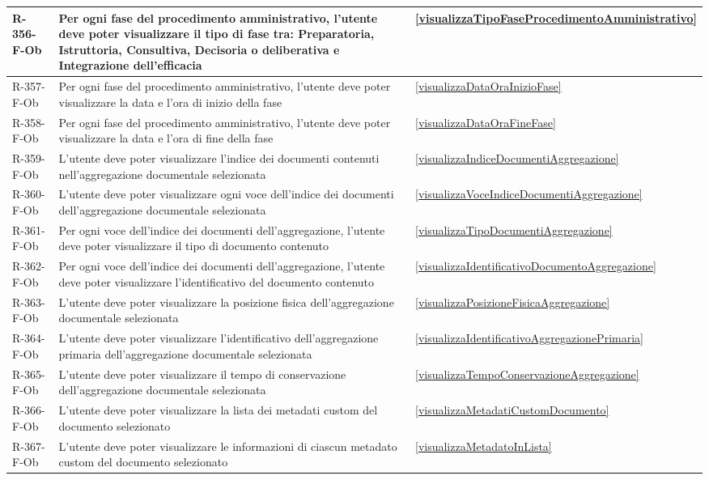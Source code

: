\begin{longtable}{|p{2.5cm}|p{9.5cm}|p{2.5cm}|}
\hline
R-356-F-Ob & Per ogni fase del procedimento amministrativo, l'utente deve poter visualizzare il tipo di fase tra: Preparatoria, Istruttoria, Consultiva, Decisoria o deliberativa e Integrazione dell'efficacia & \ref{visualizzaTipoFaseProcedimentoAmministrativo} \\
\hline
R-357-F-Ob & Per ogni fase del procedimento amministrativo, l'utente deve poter visualizzare la data e l'ora di inizio della fase & \ref{visualizzaDataOraInizioFase} \\
\hline
R-358-F-Ob & Per ogni fase del procedimento amministrativo, l'utente deve poter visualizzare la data e l'ora di fine della fase & \ref{visualizzaDataOraFineFase} \\
\hline
R-359-F-Ob & L'utente deve poter visualizzare l'indice dei documenti contenuti nell'aggregazione documentale selezionata & \ref{visualizzaIndiceDocumentiAggregazione} \\
\hline
R-360-F-Ob & L'utente deve poter visualizzare ogni voce dell'indice dei documenti dell'aggregazione documentale selezionata & \ref{visualizzaVoceIndiceDocumentiAggregazione} \\
\hline
R-361-F-Ob & Per ogni voce dell'indice dei documenti dell'aggregazione, l'utente deve poter visualizzare il tipo di documento contenuto & \ref{visualizzaTipoDocumentiAggregazione} \\
\hline
R-362-F-Ob & Per ogni voce dell'indice dei documenti dell'aggregazione, l'utente deve poter visualizzare l'identificativo del documento contenuto & \ref{visualizzaIdentificativoDocumentoAggregazione} \\
\hline
R-363-F-Ob & L'utente deve poter visualizzare la posizione fisica dell'aggregazione documentale selezionata & \ref{visualizzaPosizioneFisicaAggregazione} \\
\hline
R-364-F-Ob & L'utente deve poter visualizzare l'identificativo dell'aggregazione primaria dell'aggregazione documentale selezionata & \ref{visualizzaIdentificativoAggregazionePrimaria} \\
\hline
R-365-F-Ob & L'utente deve poter visualizzare il tempo di conservazione dell'aggregazione documentale selezionata & \ref{visualizzaTempoConservazioneAggregazione} \\
\hline
R-366-F-Ob & L'utente deve poter visualizzare la lista dei metadati custom del documento selezionato & \ref{visualizzaMetadatiCustomDocumento} \\
\hline
R-367-F-Ob & L'utente deve poter visualizzare le informazioni di ciascun metadato custom del documento selezionato & \ref{visualizzaMetadatoInLista} \\

\end{longtable}
